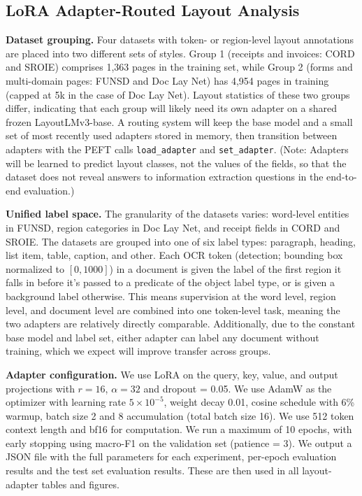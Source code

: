 \documentclass[conference]{IEEEtran}
\begin{document}
\subsection{LoRA Adapter-Routed Layout Analysis}

\textbf{Dataset grouping.} Four datasets with token- or region-level layout annotations are placed into two different sets of styles. Group 1 (receipts and invoices: CORD and SROIE) comprises 1,363 pages in the training set, while Group 2 (forms and multi-domain pages: FUNSD and Doc Lay Net) has 4,954 pages in training (capped at 5k in the case of Doc Lay Net). Layout statistics of these two groups differ, indicating that each group will likely need its own adapter on a shared frozen LayoutLMv3-base. A routing system will keep the base model and a small set of most recently used adapters stored in memory, then transition between adapters with the PEFT calls \texttt{load\_adapter} and \texttt{set\_adapter}. (Note: Adapters will be learned to predict layout classes, not the values of the fields, so that the dataset does not reveal answers to information extraction questions in the end-to-end evaluation.)

\textbf{Unified label space.} The granularity of the datasets varies: word-level entities in FUNSD, region categories in Doc Lay Net, and receipt fields in CORD and SROIE. The datasets are grouped into one of six label types: paragraph, heading, list item, table, caption, and other. Each OCR token (detection; bounding box normalized to $[0,1000]$) in a document is given the label of the first region it falls in before it's passed to a predicate of the object label type, or is given a background label otherwise. This means supervision at the word level, region level, and document level are combined into one token-level task, meaning the two adapters are relatively directly comparable. Additionally, due to the constant base model and label set, either adapter can label any document without training, which we expect will improve transfer across groups.

\textbf{Adapter configuration.} We use LoRA on the query, key, value, and output projections with $r=16$, $\alpha=32$ and dropout = 0.05. We use AdamW as the optimizer with learning rate $5\times 10^{-5}$, weight decay 0.01, cosine schedule with 6\% warmup, batch size 2 and 8 accumulation (total batch size 16). We use 512 token context length and bf16 for computation. We run a maximum of 10 epochs, with early stopping using macro-F1 on the validation set (patience = 3). We output a JSON file with the full parameters for each experiment, per-epoch evaluation results and the test set evaluation results. These are then used in all layout-adapter tables and figures.
\end{document}
